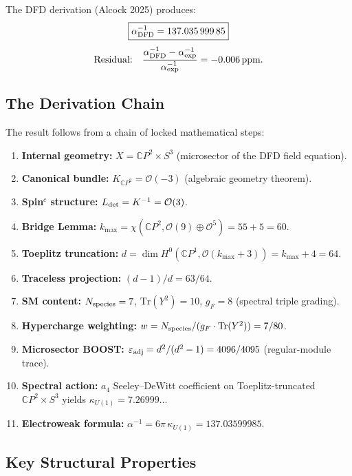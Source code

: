 \documentclass[11pt,a4paper]{article}
\begin{document}
The DFD derivation (Alcock 2025) produces:
\begin{equation}
\boxed{\alpha^{-1}_{\rm DFD} = 137.035\,999\,85}
\end{equation}
\begin{equation}
\text{Residual:}\quad \frac{\alpha^{-1}_{\rm DFD} - \alpha^{-1}_{\rm exp}}{\alpha^{-1}_{\rm exp}} = -0.006\,\text{ppm}.
\end{equation}

\subsection{The Derivation Chain}

The result follows from a chain of locked mathematical steps:

\begin{enumerate}[nosep]
\item \textbf{Internal geometry:} $X = \mathbb{C}P^2 \times S^3$ (microsector of the DFD field equation).
\item \textbf{Canonical bundle:} $K_{\mathbb{C}P^2} = \mathcal{O}(-3)$ (algebraic geometry theorem).
\item \textbf{Spin$^c$ structure:} $L_{\rm det} = K^{-1} = \mathcal{O}(3)$.
\item \textbf{Bridge Lemma:} $k_{\max} = \chi(\mathbb{C}P^2, \mathcal{O}(9) \oplus \mathcal{O}^5) = 55 + 5 = 60$.
\item \textbf{Toeplitz truncation:} $d = \dim H^0(\mathbb{C}P^1, \mathcal{O}(k_{\max}+3)) = k_{\max} + 4 = 64$.
\item \textbf{Traceless projection:} $(d-1)/d = 63/64$.
\item \textbf{SM content:} $N_{\rm species} = 7$, $\mathrm{Tr}(Y^2) = 10$, $g_F = 8$ (spectral triple grading).
\item \textbf{Hypercharge weighting:} $w = N_{\rm species}/(g_F \cdot \mathrm{Tr}(Y^2)) = 7/80$.
\item \textbf{Microsector BOOST:} $\varepsilon_{\rm adj} = d^2/(d^2-1) = 4096/4095$ (regular-module trace).
\item \textbf{Spectral action:} $a_4$ Seeley--DeWitt coefficient on Toeplitz-truncated $\mathbb{C}P^2\times S^3$ yields $\kappa_{U(1)} = 7.26999\ldots$
\item \textbf{Electroweak formula:} $\alpha^{-1} = 6\pi\,\kappa_{U(1)} = 137.03599985$.
\end{enumerate}

\subsection{Key Structural Properties}
\end{document}
